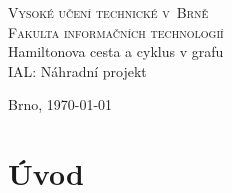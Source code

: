 \documentclass[a4paper,11pt, titlepage]{article}
\begin{document}
\begin{titlepage}

	\begin{center}
		{\Huge\textsc{Vysoké učení technické v~Brně}}\\
		\medskip
		{\huge\textsc{Fakulta informačních technologií}}\\
		{\huge Hamiltonova cesta a cyklus v grafu}\\
		\medskip
		{\LARGE IAL: Náhradní projekt}\\
	\end{center}

	\Large {\hfill Brno, \today}

\end{titlepage}

\section{Úvod}

\newpage




\end{document}

